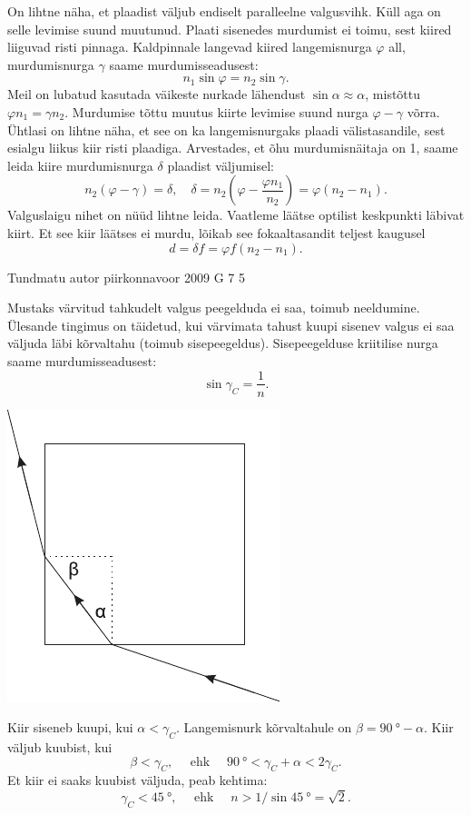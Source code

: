 \documentclass[11pt, twoside]{article}
\begin{document}
{{\ifSolution
On lihtne näha, et plaadist väljub endiselt paralleelne valgusvihk. Küll aga on selle levimise suund muutunud. Plaati sisenedes murdumist ei toimu, sest kiired liiguvad risti pinnaga. Kaldpinnale langevad kiired langemisnurga $\varphi$ all, murdumisnurga $\gamma$ saame murdumisseadusest:
\[
n_1 \sin \varphi = n_2 \sin \gamma.
\]
Meil on lubatud kasutada väikeste nurkade lähendust $\sin \alpha \approx \alpha$, mistõttu $\varphi n_1 = \gamma n_2$. Murdumise tõttu muutus kiirte levimise suund nurga $\varphi -\gamma$ võrra. Ühtlasi on lihtne näha, et see on ka langemisnurgaks plaadi välistasandile, sest esialgu liikus kiir risti plaadiga. Arvestades, et õhu murdumisnäitaja on 1, saame leida kiire murdumisnurga $\delta$ plaadist väljumisel:
\[
n_{2}(\varphi-\gamma)=\delta, \quad \delta=n_{2}\left(\varphi-\frac{\varphi n_{1}}{n_{2}}\right)=\varphi\left(n_{2}-n_{1}\right).
\]
Valguslaigu nihet on nüüd lihtne leida. Vaatleme läätse optilist keskpunkti
läbivat kiirt. Et see kiir läätses ei murdu, lõikab see fokaaltasandit teljest kaugusel
\[
d = \delta f = \varphi f (n_2 - n_1).
\]
\fi
}

{Tundmatu autor} %
{piirkonnavoor} %
{2009} %
{G 7} %
{5} %
{

\ifSolution
Mustaks värvitud tahkudelt valgus peegelduda ei saa, toimub neeldumine. Ülesande tingimus on täidetud, kui värvimata tahust kuupi sisenev valgus ei saa
väljuda läbi kõrvaltahu (toimub sisepeegeldus). Sisepeegelduse kriitilise nurga saame murdumisseadusest:
\[
\sin \gamma_{C}=\frac{1}{n}.
\]

\begin{center}
	\includegraphics[width=0.45\linewidth]{2009-v2g-07-lah}
\end{center}

Kiir siseneb kuupi, kui $\alpha<\gamma_{C}$. Langemisnurk kõrvaltahule on $\beta = \SI{90}{\degree} - \alpha$. Kiir väljub kuubist, kui
\[
\beta<\gamma_{C}, \quad \text { ehk } \quad \SI{90}{\degree}<\gamma_{C}+\alpha<2 \gamma_{C}.
\]
Et kiir ei saaks kuubist väljuda, peab kehtima:
\[
\gamma_{C}<\SI{45}{\degree}, \quad \text { ehk } \quad n>1 / \sin \SI{45}{\degree}=\sqrt{2}.
\]
\fi
}

}
\end{document}
